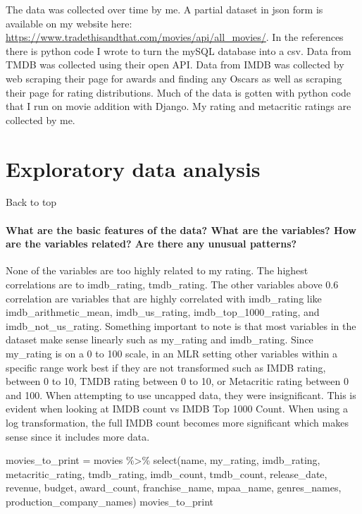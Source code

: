 \documentclass[
]{article}
\newenvironment{Shaded}{\begin{snugshade}}{\end{snugshade}}
\newcommand{\FunctionTok}[1]{\textcolor[rgb]{0.00,0.00,0.00}{#1}}
\newcommand{\NormalTok}[1]{#1}
\newcommand{\OtherTok}[1]{\textcolor[rgb]{0.56,0.35,0.01}{#1}}
\newcommand{\SpecialCharTok}[1]{\textcolor[rgb]{0.00,0.00,0.00}{#1}}
\begin{document}
The data was collected over time by me. A partial dataset in json form
is available on my website here:
\url{https://www.tradethisandthat.com/movies/api/all_movies/}. In the
references there is python code I wrote to turn the mySQL database into
a csv. Data from TMDB was collected using their open API. Data from IMDB
was collected by web scraping their page for awards and finding any
Oscars as well as scraping their page for rating distributions. Much of
the data is gotten with python code that I run on movie addition with
Django. My rating and metacritic ratings are collected by me.

\hypertarget{exploratory-data-analysis}{%
\section{Exploratory data analysis}\label{exploratory-data-analysis}}

Back to top

\hypertarget{what-are-the-basic-features-of-the-data-what-are-the-variables-how-are-the-variables-related-are-there-any-unusual-patterns}{%
\paragraph{What are the basic features of the data? What are the
variables? How are the variables related? Are there any unusual
patterns?}\label{what-are-the-basic-features-of-the-data-what-are-the-variables-how-are-the-variables-related-are-there-any-unusual-patterns}}

None of the variables are too highly related to my rating. The highest
correlations are to imdb\_rating, tmdb\_rating. The other variables
above 0.6 correlation are variables that are highly correlated with
imdb\_rating like imdb\_arithmetic\_mean, imdb\_us\_rating,
imdb\_top\_1000\_rating, and imdb\_not\_us\_rating. Something important
to note is that most variables in the dataset make sense linearly such
as my\_rating and imdb\_rating. Since my\_rating is on a 0 to 100 scale,
in an MLR setting other variables within a specific range work best if
they are not transformed such as IMDB rating, between 0 to 10, TMDB
rating between 0 to 10, or Metacritic rating between 0 and 100. When
attempting to use uncapped data, they were insignificant. This is
evident when looking at IMDB count vs IMDB Top 1000 Count. When using a
log transformation, the full IMDB count becomes more significant which
makes sense since it includes more data.

\begin{Shaded}
\begin{Highlighting}[]
\NormalTok{movies\_to\_print }\OtherTok{=}\NormalTok{ movies }\SpecialCharTok{\%\textgreater{}\%} \FunctionTok{select}\NormalTok{(name, my\_rating, imdb\_rating, metacritic\_rating, tmdb\_rating, imdb\_count, tmdb\_count, release\_date, revenue, budget, award\_count, franchise\_name, mpaa\_name, genres\_names, production\_company\_names)}
\NormalTok{movies\_to\_print }
\end{Highlighting}
\end{Shaded}
\end{document}
